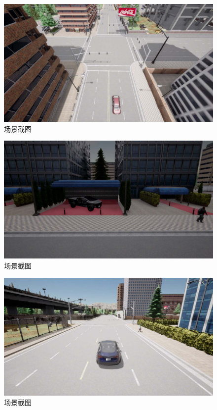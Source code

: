 \begin{figure}[H]
	\centering
	\includegraphics[width=1.0\textwidth]{"images/场景8.pdf"}
	\caption{场景截图}
	\label{}
\end{figure}
\begin{figure}[H]
	\centering
	\includegraphics[width=1.0\textwidth]{"images/场景9.pdf"}
	\caption{场景截图}
	\label{}
\end{figure}
\begin{figure}[H]
	\centering
	\includegraphics[width=1.0\textwidth]{"images/场景10.pdf"}
	\caption{场景截图}
	\label{}
\end{figure}
